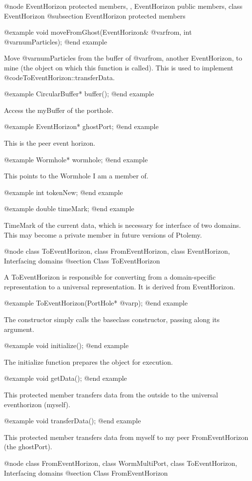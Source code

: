 @node EventHorizon protected members,  , EventHorizon public members, class EventHorizon
@subsection EventHorizon protected members

@example
void moveFromGhost(EventHorizon& @var{from}, int @var{numParticles});
@end example

Move @var{numParticles} from the buffer of @var{from}, another
EventHorizon, to mine (the object on which this function is called).
This is used to implement @code{ToEventHorizon::transferData}.

@example
CircularBuffer* buffer();
@end example

Access the myBuffer of the porthole.

@example
EventHorizon* ghostPort;
@end example

This is the peer event horizon.

@example
Wormhole* wormhole;
@end example

This points to the Wormhole I am a member of.

@example
int tokenNew;
@end example

@example
double timeMark;
@end example

TimeMark of the current data, which is necessary for interface
of two domains.  This may become a private member in future versions
of Ptolemy.

@node class ToEventHorizon, class FromEventHorizon, class EventHorizon, Interfacing domains
@section Class ToEventHorizon

A ToEventHorizon is responsible for converting from a domain-specific
representation to a universal representation.  It is derived from
EventHorizon.

@example
ToEventHorizon(PortHole* @var{p});
@end example

The constructor simply calls the baseclass constructor, passing along
its argument.

@example
void initialize();
@end example

The initialize function prepares the object for execution.

@example
void getData();
@end example

This protected member transfers data from the outside to the universal
eventhorizon (myself).

@example
void transferData();
@end example

This protected member transfers data from myself to my peer
FromEventHorizon (the ghostPort).

@node class FromEventHorizon, class WormMultiPort, class ToEventHorizon, Interfacing domains
@section Class FromEventHorizon

